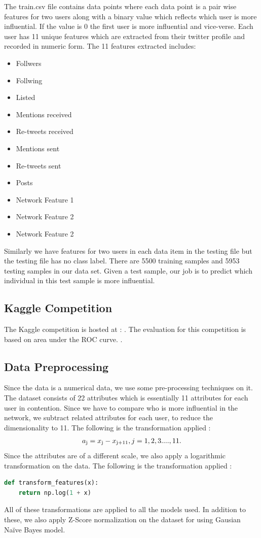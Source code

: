 \documentclass[conference]{IEEEtran}
\numberwithin{equation}{section}
\numberwithin{figure}{section}
\numberwithin{table}{section}
\begin{document}
The train.csv file contains data points where each data point is a pair wise features for two users along with a binary value which reflects which user is more influential. If the value is 0 the first user is more influential and vice-verse. Each user has 11 unique features which are extracted from their twitter profile and recorded in numeric form. The 11 features extracted includes:

\begin{itemize}
  \item Follwers
  \item Follwing
  \item Listed
  \item Mentions received
  \item Re-tweets received
  \item Mentions sent
  \item Re-tweets sent
  \item Posts
  \item Network Feature 1
  \item Network Feature 2
  \item Network Feature 2
\end{itemize}

Similarly we have features for two users in each data item in the testing file but the testing file has no class label. There are 5500 training samples and 5953 testing samples in our data set. Given a test sample, our job is to predict which individual in this test sample is more influential.

\subsection{Kaggle Competition}
The Kaggle competition is hosted at : \cite{kaggle2}. The evaluation for this competition is based on area under the ROC curve. \cite{roc}.

\subsection{Data Preprocessing
}\label{sec:formatting-text}

Since the data is a numerical data, we use some pre-processing techniques on it. The dataset consists of 22 attributes which is essentially 11 attributes for each user in contention. Since we have to compare who is more influential in the network, we subtract related attributes for each user, to reduce the dimensionality to 11. The following is the transformation applied : 
\begin{align*}
a\textsubscript{j} = x\textsubscript{j} - x\textsubscript{j+11}, j = 1,2,3 .... , 11. 
\end{align*}
Since the attributes are of a different scale, we also apply a logarithmic transformation on the data. The following is the transformation applied :
\begin{lstlisting}[language=Python, caption = Log Transformation ]
def transform_features(x):
    return np.log(1 + x)
\end{lstlisting}
All of these transformations are applied to all the models used. In addition to these, we also apply Z-Score normalization on the dataset for using Gausian Na{\"i}ve Bayes model.
\end{document}
